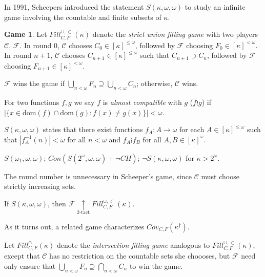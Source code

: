 \documentclass{beamer}
\theoremstyle{definition}
\newtheorem{game}[theorem]{Game}
\newcommand{\ktactwin}[1]{\underset{#1\text{-tact}}{\uparrow}}
\newcommand{\oneptlind}[1]{#1^\dagger}
\newcommand{\mengame}[1]{Cov_{C,F}(#1)}
\newcommand{\fillgameS}[1]{Fill^{\cup,\subset}_{C,F}(#1)}
\newcommand{\fillgameInt}[1]{Fill^{\cap}_{C,F}(#1)}
\newcommand{\<}{\langle}
\renewcommand{\>}{\rangle}
\newcommand{\alcomp}{\wr}
\newcommand{\dom}{\textrm{dom}}
\newcommand{\alcompS}[1]{S(#1,\omega,\omega)}
\newcommand{\pl}[1]{\mathscr{#1}}
\newcommand{\term}{\textit}
\begin{document}
\begin{frame}
  In 1991, Scheepers introduced the statement $\alcompS\kappa$ to study an
  infinite game involving the countable and finite subsets of $\kappa$.

  \pause

  \begin{game}
    Let $\fillgameS\kappa$ denote the \term{strict union filling game}
    with two players $\pl C$, $\pl F$. In round $0$, $\pl C$ chooses
    $C_0\in[\kappa]^{\leq\omega}$, followed by $\pl F$ choosing
    $F_0\in[\kappa]^{<\omega}$. In round $n+1$, $\pl C$ chooses
    $C_{n+1}\in[\kappa]^{\leq\omega}$ such that $C_{n+1}\supset C_n$, followed
    by $\pl F$ choosing $F_{n+1}\in[\kappa]^{<\omega}$.

    $\pl F$ wins the game if
    $\bigcup_{n<\omega} F_n\supseteq\bigcup_{n<\omega} C_n$; otherwise, $\pl C$
    wins.
  \end{game}
\end{frame}

\begin{frame}
  \begin{definition}
    For two functions $f,g$ we say $f$ is \term{almost compatible} with
    $g$ ($f\alcomp g$) if $|\{x\in\dom(f)\cap\dom(g):f(x)\not=g(x)\}|<\omega$.
  \end{definition}
  \pause
  \begin{definition}
    $\alcompS\kappa$ states that there exist functions
    $f_A:A\to\omega$ for each $A\in[\kappa]^{\leq\omega}$ such that
    $|f_A^{-1}(n)|<\omega$ for all $n<\omega$ and
    $f_A\alcomp f_B$ for all $A,B\in[\kappa]^\omega$.
  \end{definition}
  \pause
  \begin{theorem}
    $\alcompS{\omega_1}$; $Con(\alcompS{2^\omega}+\neg CH)$;
    $\neg\alcompS\kappa$ for $\kappa>2^\omega$.
  \end{theorem}
\end{frame}

\begin{frame}
  The round number is unnecessary in Scheeper's game, since $\pl C$ must
  choose strictly increasing sets.

  \begin{theorem}
    If $\alcompS\kappa$, then $\pl F\ktactwin2 \fillgameS\kappa$.
  \end{theorem}

  \pause

  As it turns out, a related game characterizes $\mengame{\oneptlind\kappa}$.

  \begin{definition}
    Let $\fillgameInt\kappa$ denote the \term{intersection filling game}
    analogous to $\fillgameS\kappa$, except that $\pl C$ has no restriction
    on the countable sets she choooses, but $\pl F$ need only ensure that
    $\bigcup_{n<\omega} F_n\supseteq \bigcap_{n<\omega} C_n$ to win
    the game.
  \end{definition}
\end{frame}
\end{document}

